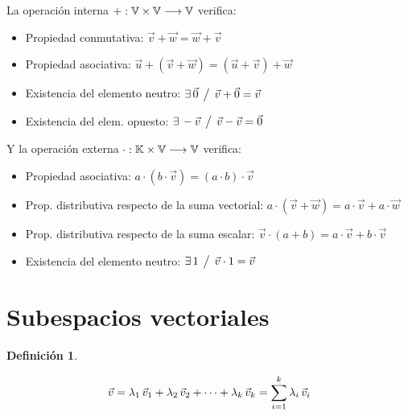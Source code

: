 \documentclass[a5paper,12pt,twoside]{book}
\newtheorem{defn}{{Definición}}[chapter]
\begin{document}
La operación interna $+:\mathbb{V} \times \mathbb{V} \longrightarrow \mathbb{V} $ verifica:

\begin{itemize}
    \item Propiedad conmutativa: $\Vec{v}+\Vec{w}=\Vec{w}+\Vec{v}$
    \item Propiedad asociativa: $\Vec{u} + \left( \Vec{v}+\Vec{w} \right) = \left( \Vec{u} + \Vec{v} \right) + \Vec{w}$
    \item Existencia del elemento neutro: $\exists \, \Vec{0} \hspace{1ex} \big/ \hspace{1ex} \Vec{v} + \Vec{0} = \Vec{v}$
    \item Existencia del elem. opuesto: $\exists \, -\Vec{v} \hspace{1ex} \big/ \hspace{1ex} \Vec{v} - \Vec{v} = \Vec{0}$
\end{itemize}

Y la operación externa $\cdot:\mathbb{K} \times \mathbb{V} \longrightarrow \mathbb{V}$ verifica:

\begin{itemize}
    \item Propiedad asociativa: $a \cdot \left( b \cdot \Vec{v} \right) = \left( a \cdot b \right) \cdot \Vec{v}$
    \item Prop. distributiva respecto de la suma vectorial: $a \cdot \left( \Vec{v} + \Vec{w} \right) = a \cdot \Vec{v} + a \cdot \Vec{w}$
    \item Prop. distributiva respecto de la suma escalar: $\Vec{v} \cdot \left(a+b\right) = a \cdot \Vec{v} + b \cdot \Vec{v}$
    \item Existencia del elemento neutro: $\exists \, 1 \hspace{1ex} \big/ \hspace{1ex} \Vec{v} \cdot 1 = \Vec{v}$
\end{itemize}


\section{Subespacios vectoriales}

\begin{mdframed}[style=DefinitionFrame]
    \begin{defn}
    \end{defn}
    \begin{equation*}
        \Vec{v} = \lambda_1 \, \Vec{v}_1 + \lambda_2 \, \Vec{v}_2 + \dots + \lambda_k \, \Vec{v}_k
        = \sum_{i=1}^k \lambda_i \, \Vec{v}_i
    \end{equation*}
\end{mdframed}
\end{document}
